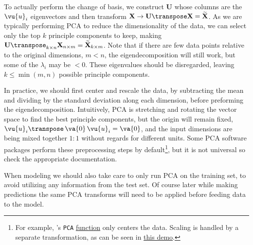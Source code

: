 To actually perform the change of basis,
we construct $\mathbf{U}$ whose columns are the $\vu{u}_{i}$ eigenvectors
and then transform $\mathbf{X} \to\mathbf{U}\transpose \mathbf{X} = \widetilde{\mathbf{X}}$.
As we are typically performing PCA to reduce the dimensionality of the data,
we can select only the top $k$ principle components to keep, making
$\mathbf{U}\transpose_{k \times n} \mathbf{X}_{n \times m} = \widetilde{\mathbf{X}}_{k \times m}$.
Note that if there are few data points relative to the original dimensions, $m < n$,
the eigendecomposition will still work, but some of the $\lambda_{i}$ may be $< 0$.
These eigenvalues should be disregarded, leaving $k \leq \min\left(m,n\right)$ possible principle components.

In practice, we should first center and rescale the data,
by subtracting the mean and dividing by the standard deviation along each dimension,
before preforming the eigendecomposition.
Intuitively, PCA is stretching and rotating the vector space to find the best principle components,
but the origin will remain fixed, $\vu{u}_{i}\transpose\,\va{0}\,\vu{u}_{i} = \va{0}$,
and the input dimensions are being mixed together $1 \mathbin{:} 1$ without regards for different units.
Some PCA software packages perform these preprocessing steps by default\footnote{For example,
{\sklearn}'s \texttt{PCA}
\href{https://scikit-learn.org/stable/modules/generated/sklearn.decomposition.PCA.html}{function}
only centers the data.
Scaling is handled by a separate transformation, as can be seen in
\href{https://scikit-learn.org/stable/auto\_examples/preprocessing/plot\_scaling\_importance.html}{this demo}.},
but it is not universal so check the appropriate documentation.

When modeling we should also take care to only run PCA on the training set,
to avoid utilizing any information from the test set.
Of course later while making predictions the same PCA transforms
will need to be applied before feeding data to the model.


